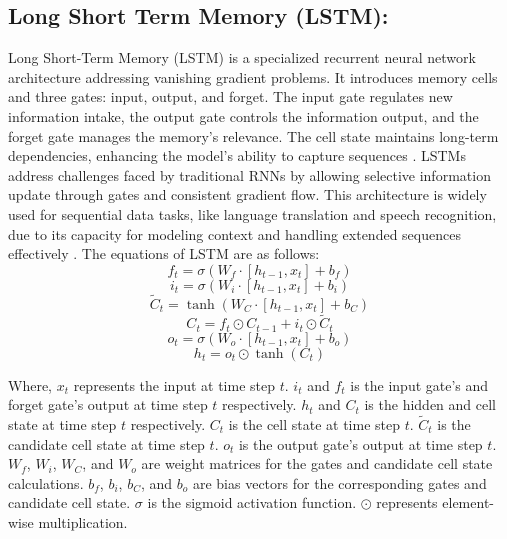 \documentclass[sn-mathphys,Numbered]{sn-jnl}
\theoremstyle{thmstyleone}
\theoremstyle{thmstyletwo}
\theoremstyle{thmstylethree}
\begin{document}
\subsection{Long Short Term Memory (LSTM):}
Long Short-Term Memory (LSTM) is a specialized recurrent neural network architecture addressing vanishing gradient problems. It introduces memory cells and three gates: input, output, and forget. The input gate regulates new information intake, the output gate controls the information output, and the forget gate manages the memory's relevance. The cell state maintains long-term dependencies, enhancing the model's ability to capture sequences \cite{guillen2020deep}. LSTMs address challenges faced by traditional RNNs by allowing selective information update through gates and consistent gradient flow. This architecture is widely used for sequential data tasks, like language translation and speech recognition, due to its capacity for modeling context and handling extended sequences effectively \cite{qiu2021river}. The equations of LSTM are as follows:
\begin{equation}
f_t = \sigma(W_f \cdot [h_{t-1}, x_t] + b_f)
\end{equation}
\begin{equation}
i_t = \sigma(W_i \cdot [h_{t-1}, x_t] + b_i)
\end{equation}
\begin{equation}
\tilde{C}_t = \tanh(W_C \cdot [h_{t-1}, x_t] + b_C)
\end{equation}
\begin{equation}
C_t = f_t \odot C_{t-1} + i_t \odot \tilde{C}_t
\end{equation}
\begin{equation}
o_t = \sigma(W_o \cdot [h_{t-1}, x_t] + b_o)
\end{equation}
\begin{equation}
h_t = o_t \odot \tanh(C_t)
\end{equation}


Where, \(x_t\) represents the input at time step \(t\).
 \(i_t\) and \(f_t\) is the input gate's and forget gate's output at time step \(t\) respectively.
 \(h_t\) and \(C_t\) is the hidden and cell state at time step \(t\) respectively.
 \(C_t\) is the cell state at time step \(t\).
 \(\tilde{C}_t\) is the candidate cell state at time step \(t\).
 \(o_t\) is the output gate's output at time step \(t\).
 \(W_f\), \(W_i\), \(W_C\), and \(W_o\) are weight matrices for the gates and candidate cell state calculations.
 \(b_f\), \(b_i\), \(b_C\), and \(b_o\) are bias vectors for the corresponding gates and candidate cell state.
 \(\sigma\) is the sigmoid activation function.
 \(\odot\) represents element-wise multiplication.
\end{document}
